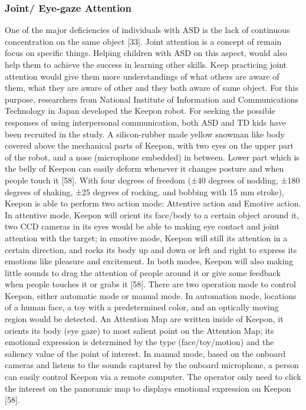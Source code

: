 \subsubsection{Joint/ Eye-gaze Attention}
One of the major deficiencies of individuals with ASD is the lack of continuous concentration on the same object [33]. Joint attention is a concept of remain focus on specific things. Helping children with ASD on this aspect, would also help them to achieve the success in learning other skills. Keep practicing joint attention would give them more understandings of what others are aware of them, what they are aware of other and they both aware of same object.
For this purpose, researchers from National Institute of Information and Communications Technology in Japan developed the Keepon robot. For seeking the possible responses of using interpersonal communication, both ASD and TD kids have been recruited in the study. A silicon-rubber made yellow snowman like body covered above the mechanical parts of Keepon, with two eyes on the upper part of the robot, and a nose (microphone embedded) in between. Lower part which is the belly of Keepon can easily deform whenever it changes posture and when people touch it [58].
With four degrees of freedom (±40 degrees of nodding, ±180 degrees of shaking, ±25 degrees of rocking, and bobbing with 15 mm stroke), Keepon is able to perform two action mode: Attentive action and Emotive action. In attentive mode, Keepon will orient its face/body to a certain object around it, two CCD cameras in its eyes would be able to making eye contact and joint attention with the target; in emotive mode, Keepon will still its attention in a certain direction, and rocks its body up and down or left and right to express its emotions like pleasure and excitement. In both modes, Keepon will also making little sounds to drag the attention of people around it or give some feedback when people touches it or grabs it [58]. 
There are two operation mode to control Keepon, either automatic mode or manual mode. In automation mode, locations of a human face, a toy with a predetermined color, and an optically moving region would be detected. An Attention Map are written inside of Keepon, it orients its body (eye gaze) to most salient point on the Attention Map; its emotional expression is determined by the type (face/toy/motion) and the saliency value of the point of interest. In manual mode, based on the onboard cameras and listens to the sounds captured by the onboard microphone, a person can easily control Keepon via a remote computer. The operator only need to click the interest on the panoramic map to displays emotional expression on Keepon [58].
